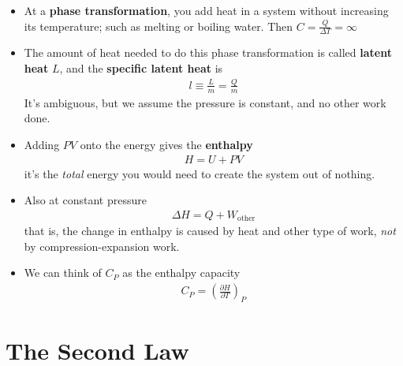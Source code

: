 \documentclass{book}
\begin{document}
\begin{itemize}
	\item At a \textbf{phase transformation}, you add heat in a system without increasing its temperature;
	      such as melting or boiling water. Then $C = \frac{Q}{\Delta{T}} = \infty$
	\item The amount of heat needed to do this phase transformation is called \textbf{latent heat} $L$,
	      and the \textbf{specific latent heat} is
	      \begin{align}
		      \label{eq:specific latent}
		      l \equiv \frac{L}{m}= \frac{Q}{m}
	      \end{align}
	      It's ambiguous, but we assume the pressure is constant, and no other work done.
	\item Adding $PV$ onto the energy gives the \textbf{enthalpy}
	      \begin{align}
		      \label{eq:enthalpy}
		      H = U + PV
	      \end{align}
	      it's the \textit{total} energy you would need to create the system out of nothing.
	\item Also at constant pressure
	      \begin{align}
		      \Delta{H} = Q + W_\text{other}
	      \end{align}
	      that is, the change in enthalpy is caused by heat and other type of work, \textit{not} by
	      compression-expansion work.
	\item We can think of $C_P$ as the enthalpy capacity
	      \begin{align}
		      C_P = \left( \frac{\partial H}{\partial T} \right)_P
	      \end{align}




\end{itemize}


\chapter{The Second Law}
\end{document}
